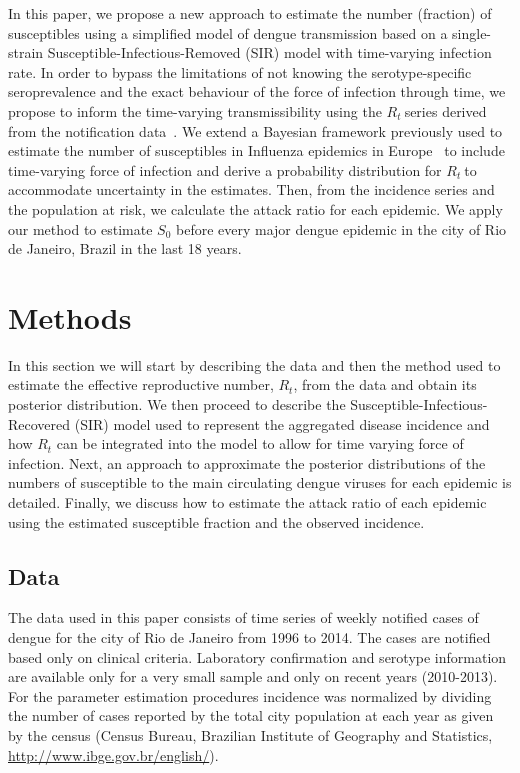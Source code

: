 \documentclass[10pt]{article}
\def \rr {$R_{t}\:$}
\begin{document}
In this paper, we propose a new approach to estimate the number (fraction) of 
susceptibles using a simplified model of dengue transmission based on a 
single-strain Susceptible-Infectious-Removed (SIR) model with time-varying 
infection rate.
In order to bypass the limitations of not knowing the serotype-specific 
seroprevalence and the exact behaviour of the force of infection through time, 
we
propose to inform the time-varying transmissibility using the \rr series 
derived from the notification data~\cite{nishiura}.
We extend a Bayesian framework previously used to estimate the number 
of susceptibles in Influenza epidemics in Europe~\cite{pone2011} to include 
time-varying force of infection and derive a probability distribution  for 
\rr to accommodate uncertainty in the estimates. 
Then, from the incidence series and the population at risk, we  calculate the 
attack ratio for each epidemic.
We apply our method to estimate $S_0$ before every major dengue epidemic in the 
city of Rio de Janeiro, Brazil in the last 18 years.

\section*{Methods}

In this section we will start by describing the data and then the method used 
to estimate the effective reproductive number, $R_t$, from the data and obtain 
its posterior distribution. 
We then proceed to describe the Susceptible-Infectious-Recovered (SIR) model 
used to represent the aggregated disease incidence and how $R_t$ can be 
integrated into the model to allow for time varying force of infection. 
Next, an approach to approximate the posterior distributions 
of the numbers of susceptible to the main circulating dengue viruses for each 
epidemic is detailed.
Finally, we discuss how to estimate the attack ratio of each 
epidemic using the estimated susceptible fraction and the observed incidence.

\subsection*{Data} 

The data used in this paper consists of time 
series of weekly notified cases of dengue for the 
city of Rio de Janeiro from 1996 to 2014. The cases are notified 
based only on clinical criteria.
Laboratory confirmation and serotype 
information are available only for a very small sample and only on recent 
years (2010-2013).
For the parameter estimation  procedures incidence was normalized by dividing 
the number of cases reported by the total city population at each year as given 
by the census (Census Bureau, Brazilian Institute of Geography and Statistics, 
\url{http://www.ibge.gov.br/english/}).
\end{document}
